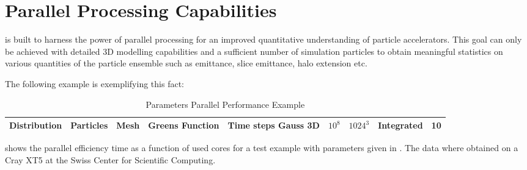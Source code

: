 \section{Parallel Processing Capabilities}
\opal is built to harness the power of parallel processing for an improved quantitative understanding
of particle accelerators.
This goal can only be achieved with
detailed 3D modelling capabilities and a sufficient number of simulation particles to obtain meaningful statistics on various
quantities of the particle ensemble such as emittance, slice emittance, halo extension etc.

The following example is exemplifying this fact:



\begin{table}[!htb]
\caption[]{Parameters Parallel Performance Example}
\begin{tabular*}{\columnwidth}{@{\extracolsep{\fill}}lrrrr}
\hline
       Distribution & Particles  & Mesh & Greens Function & Time steps
\hline
      Gauss 3D & $10^8$ & $1024^3$ & Integrated  & 10 \\
\hline
\end{tabular*}
\label{tab:pex1}
\end{table}

 shows the parallel efficiency time as a function of used cores for a test example with parameters given in .  The data where obtained on a Cray XT5 at the Swiss Center for Scientific Computing.

